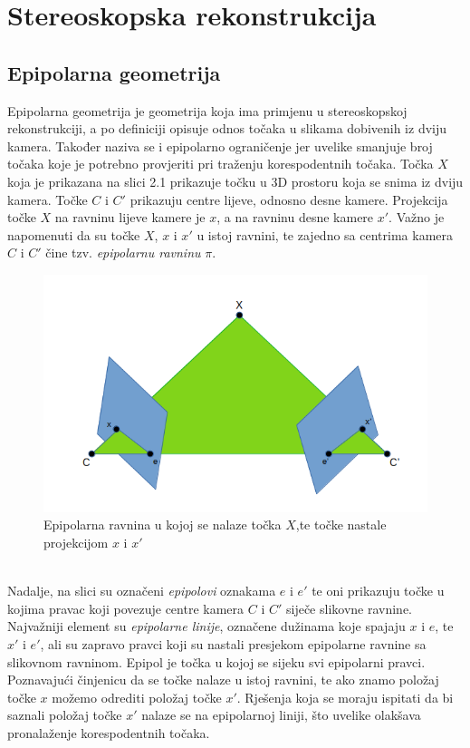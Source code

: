 \documentclass[times, utf8, zavrsni, numeric]{fer}
\begin{document}
\chapter{Stereoskopska rekonstrukcija}
\section{Epipolarna geometrija}
Epipolarna geometrija je geometrija koja ima primjenu u stereoskopskoj rekonstrukciji, a po definiciji opisuje odnos točaka u slikama dobivenih iz dviju kamera. Također naziva se i epipolarno ograničenje jer uvelike smanjuje broj točaka koje je potrebno provjeriti pri traženju korespodentnih točaka. Točka $X$ koja je prikazana na slici 2.1 prikazuje točku u 3D prostoru koja se snima iz dviju kamera. Točke $C$ i $C'$ prikazuju centre lijeve, odnosno desne kamere. Projekcija točke $X$ na ravninu lijeve kamere je $x$, a na ravninu desne kamere $x'$. Važno je napomenuti da su točke $X$, $x$ i $x'$ u istoj ravnini, te zajedno sa centrima kamera $C$ i $C'$ čine tzv. \textit{epipolarnu ravninu} $\pi$.\\
\begin{figure}[htb]
\centering
\includegraphics[scale=0.46]{img/slika1.png}
\caption{Epipolarna ravnina u kojoj se nalaze točka $X$,te točke nastale projekcijom $x$ i $x'$}
\label{fig:Epipolar}
\end{figure}\\
Nadalje, na slici su označeni \textit{epipolovi} oznakama $e$ i $e'$ te oni prikazuju točke u kojima pravac koji povezuje centre kamera $C$ i $C'$ siječe slikovne ravnine.
Najvažniji element su \textit{epipolarne linije}, označene dužinama koje spajaju $x$ i $e$, te $x'$ i $e'$, ali su zapravo pravci koji su nastali presjekom epipolarne ravnine sa slikovnom ravninom. Epipol je točka u kojoj se sijeku svi epipolarni pravci.\\
Poznavajući činjenicu da se točke nalaze u istoj ravnini, te ako znamo položaj točke $x$ možemo odrediti položaj točke $x'$. Rješenja koja se moraju ispitati da bi saznali položaj točke $x'$ nalaze se na epipolarnoj liniji, što uvelike olakšava pronalaženje korespodentnih točaka.
\end{document}
